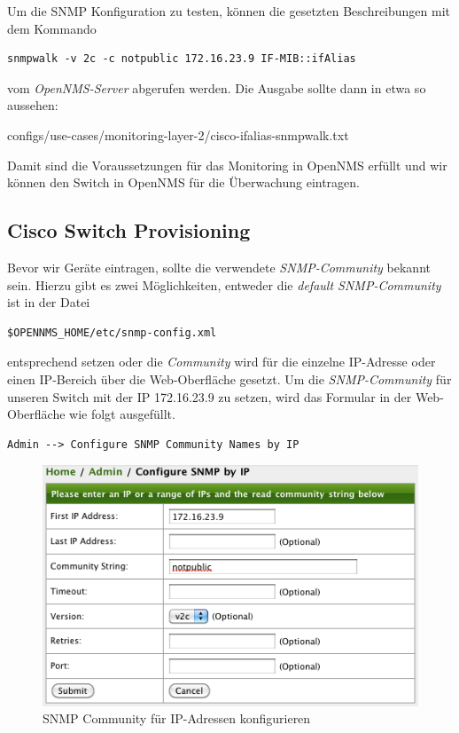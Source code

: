 Um die SNMP Konfiguration zu testen, können die gesetzten Beschreibungen mit dem Kommando

\begin{lstlisting}[numbers=none]
snmpwalk -v 2c -c notpublic 172.16.23.9 IF-MIB::ifAlias
\end{lstlisting}

vom \textit{OpenNMS-Server} abgerufen werden. Die Ausgabe sollte dann in etwa so aussehen:


  {configs/use-cases/monitoring-layer-2/cisco-ifalias-snmpwalk.txt}

Damit sind die Voraussetzungen für das Monitoring in OpenNMS erfüllt und wir können den Switch in OpenNMS für die Überwachung eintragen.

\subsection{Cisco Switch Provisioning}
Bevor wir Geräte eintragen, sollte die verwendete \textit{SNMP-Community} bekannt sein. Hierzu gibt es zwei Möglichkeiten, entweder die \textit{default SNMP-Community} ist in der Datei

\begin{lstlisting}[numbers=none]
$OPENNMS_HOME/etc/snmp-config.xml
\end{lstlisting}

entsprechend setzen oder die \textit{Community} wird für die einzelne IP-Adresse oder einen IP-Bereich über die Web-Oberfläche gesetzt. Um die \textit{SNMP-Community} für unseren Switch mit der IP 172.16.23.9 zu setzen, wird das Formular in der Web-Oberfläche wie folgt ausgefüllt.

\begin{lstlisting}[numbers=none]
Admin --> Configure SNMP Community Names by IP
\end{lstlisting}

\begin{figure}[H]
	\centering
	\includegraphics[width=1.0\textwidth]{images/use-cases/monitoring-layer-2/configure-snmp-by-ip}
	\caption{SNMP Community für IP-Adressen konfigurieren}
	\label{pic:configure-snmp-by-ip}
\end{figure}

